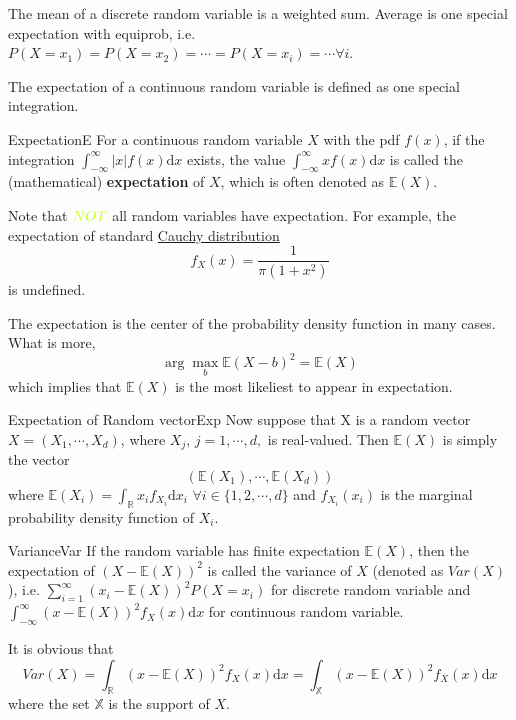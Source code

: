 \documentclass[titlestyle=hang,11pt]{elegantbook}
\begin{document}
The mean of a discrete random variable is a weighted sum. Average is one special expectation with equiprob, i.e. $P(X=x_1)=P(X=x_2) = \cdots = P(X = x_i) = \cdots \forall i$.

The expectation of a continuous random variable is defined as one special integration.
\begin{definition}{Expectation}{E}
 For a continuous random variable $X$ with the pdf $f(x)$, if the integration $\int_{-\infty}^{\infty}|x|f(x)\mathrm{d}x$ exists, the value $\int_{-\infty}^{\infty} xf(x)\mathrm{d}x$  is called the (mathematical) \textbf{expectation} of $X$, which is often denoted as $\mathbb{E}(X)$.
\end{definition}

Note that $\color{lime}{NOT}$ all random variables have expectation. For example, the expectation of standard \href{https://www.wikiwand.com/en/Cauchy_distribution}{Cauchy distribution}
$$f_X(x)=\frac{1}{\pi(1+x^2)}$$
is undefined.

The expectation is the center of the probability density function in many cases. What is more,
$$\arg\max_{b}\mathbb{E}(X-b)^2=\mathbb{E}(X)$$
which implies that $\mathbb{E}(X)$ is the most likeliest to appear in expectation.

\begin{definition}{Expectation of Random vector}{Exp}
 Now suppose that X is a random vector $X = (X_1, \cdots, X_d )$, where $X_j$, $j = 1, \cdots, d,$ is real-valued. Then $\mathbb{E}(X)$ is simply the vector
 $$(\mathbb{E}(X_1), \cdots , \mathbb{E}(X_d))$$
where $\mathbb{E}(X_i)=\int_{\mathbb{R}}x_if_{X_i}\mathrm{d}x_i\,\,\forall i\in\{1,2, \cdots, d\}$ and $f_{X_i}(x_i)$ is the marginal probability density function of $X_i$.
\end{definition}


\begin{definition}{Variance}{Var}
If the random variable has finite expectation $\mathbb{E}(X)$, then the expectation of $(X-\mathbb{E}(X))^2$  is called the variance of $X$ (denoted as $Var(X)$), i.e. $\sum_{i=1}^{\infty}(x_i-\mathbb{E}(X))^2P(X=x_i)$ for discrete random variable and  $\int_{-\infty}^{\infty}(x-\mathbb{E}(X))^2f_X(x)\mathrm{d}x$ for  continuous random variable.
\end{definition}

It is obvious that
$$Var(X)=\int_{\mathbb{R}}(x-\mathbb{E}(X))^2f_X(x)\mathrm{d}x=\int_{\mathbb{X}}(x-\mathbb{E}(X))^2f_X(x)\mathrm{d}x$$
where the set $\mathbb{X}$ is  the support of $X$.
\end{document}
